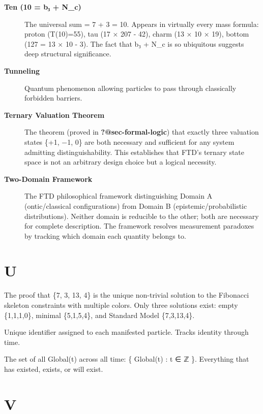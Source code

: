 \documentclass[
  11pt,
  letterpaper,
  twoside,
  openright]{book}
\providecommand{\tightlist}{%
  \setlength{\itemsep}{0pt}\setlength{\parskip}{0pt}}
\begin{document}
\begin{description}
\item[\textbf{Ten (10 = b₃ + N\_c)}]
The universal sum = 7 + 3 = 10. Appears in virtually every mass formula:
proton (T(10)=55), tau (17 × 207 - 42), charm (13 × 10 × 19), bottom
(127 = 13 × 10 - 3). The fact that b₃ + N\_c is so ubiquitous suggests
deep structural significance.
\item[\textbf{Tunneling}]
Quantum phenomenon allowing particles to pass through classically
forbidden barriers.
\item[\textbf{Ternary Valuation Theorem}]
The theorem (proved in \textbf{?@sec-formal-logic}) that exactly three
valuation states \{+1, −1, 0\} are both necessary and sufficient for any
system admitting distinguishability. This establishes that FTD's ternary
state space is not an arbitrary design choice but a logical necessity.
\item[\textbf{Two-Domain Framework}]
The FTD philosophical framework distinguishing Domain A (ontic/classical
configurations) from Domain B (epistemic/probabilistic distributions).
Neither domain is reducible to the other; both are necessary for
complete description. The framework resolves measurement paradoxes by
tracking which domain each quantity belongs to.
\end{description}

\section{U}\label{u}

\begin{description}
\tightlist
\item[\textbf{Uniqueness Theorem}]
The proof that \{7, 3, 13, 4\} is the unique non-trivial solution to the
Fibonacci skeleton constraints with multiple colors. Only three
solutions exist: empty \{1,1,1,0\}, minimal \{5,1,5,4\}, and Standard
Model \{7,3,13,4\}.
\item[\textbf{UUID}]
Unique identifier assigned to each manifested particle. Tracks identity
through time.
\item[\textbf{𝕌 (Universe)}]
The set of all Global(t) across all time: \{ Global(t) : t ∈ ℤ \}.
Everything that has existed, exists, or will exist.
\end{description}

\section{V}\label{v}
\end{document}
